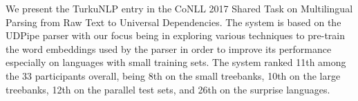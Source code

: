 We present the TurkuNLP entry in the CoNLL 2017 Shared Task on Multilingual Parsing from Raw Text to Universal Dependencies. The system is based on the UDPipe parser with our focus being in exploring various techniques to pre-train the word embeddings used by the parser in order to improve its performance especially on languages with small training sets. The system ranked 11th among the 33 participants overall, being 8th on the small treebanks, 10th on the large treebanks, 12th on the parallel test sets, and 26th on the surprise languages.
